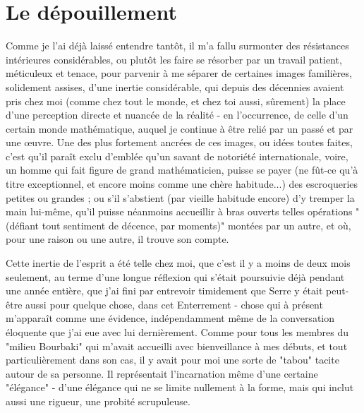 \section{Le dépouillement}

Comme je l'ai déjà laissé entendre tantôt, il m'a fallu surmonter des résistances intérieures considérables, ou plutôt les faire se résorber par un travail patient, méticuleux et tenace, pour parvenir à me séparer de certaines images familières, solidement assises, d'une inertie considérable, qui depuis des décennies avaient pris chez moi (comme chez tout le monde, et chez toi aussi, sûrement) la place d'une perception directe et nuancée de la réalité - en l'occurrence, de celle d'un certain monde mathématique, auquel je continue à être relié par un passé et par une œuvre. Une des plus fortement ancrées de ces images, ou idées toutes faites, c'est qu'il paraît exclu d'emblée qu'un savant de notoriété internationale, voire, un homme qui fait figure de grand mathématicien, puisse se payer (ne fût-ce qu’à titre exceptionnel, et encore moins comme une chère habitude...) des escroqueries petites ou grandes ; ou s'il s'abstient (par vieille habitude encore) d'y tremper la main lui-même, qu'il puisse néanmoins accueillir à bras ouverts telles opérations "(défiant tout sentiment de décence, par moments)" montées par un autre, et où, pour une raison ou une autre, il trouve son compte.

Cette inertie de l'esprit a été telle chez moi, que c'est il y a moins de deux mois seulement, au terme d'une longue réflexion qui s'était poursuivie déjà pendant une année entière, que j'ai fini par entrevoir timidement que Serre y était peut-être aussi pour quelque chose, dans cet Enterrement - chose qui à présent m'apparaît comme une évidence, indépendamment même de la conversation éloquente que j'ai eue avec lui dernièrement. Comme pour tous les membres du "milieu Bourbaki" qui m'avait accueilli avec bienveillance à mes débuts, et tout particulièrement dans son cas, il y avait pour moi une sorte de "tabou" tacite autour de sa personne. Il représentait l'incarnation même d'une certaine "élégance" - d'une élégance qui ne se limite nullement à la forme, mais qui inclut aussi une rigueur, une probité scrupuleuse.

